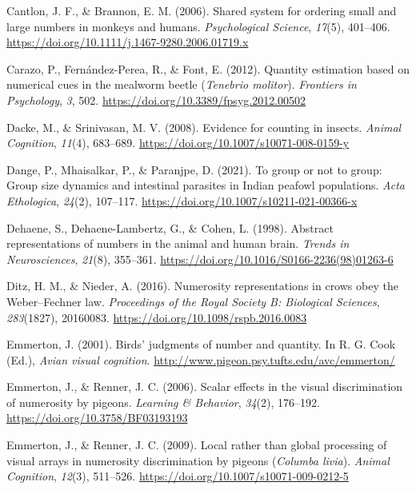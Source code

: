 \documentclass[
  ,pub,floatsintext]{apa6}
\newlength{\cslhangindent}
\newlength{\cslentryspacingunit} %
\newenvironment{CSLReferences}[2] %
 {%
  \setlength{\parindent}{0pt}
  \ifodd #1
  \let\oldpar\par
  \def\par{\hangindent=\cslhangindent\oldpar}
  \fi
  \setlength{\parskip}{#2\cslentryspacingunit}
 }%
 {}
\begin{document}
\begin{CSLReferences}{1}{0}
\leavevmode{}%
Cantlon, J. F., \& Brannon, E. M. (2006). Shared system for ordering small and large numbers in monkeys and humans. \emph{Psychological Science}, \emph{17}(5), 401--406. \url{https://doi.org/10.1111/j.1467-9280.2006.01719.x}

\leavevmode{}%
Carazo, P., Fernández-Perea, R., \& Font, E. (2012). Quantity estimation based on numerical cues in the mealworm beetle (\emph{{Tenebrio} molitor}). \emph{Frontiers in Psychology}, \emph{3}, 502. \url{https://doi.org/10.3389/fpsyg.2012.00502}

\leavevmode{}%
Dacke, M., \& Srinivasan, M. V. (2008). Evidence for counting in insects. \emph{Animal Cognition}, \emph{11}(4), 683--689. \url{https://doi.org/10.1007/s10071-008-0159-y}

\leavevmode{}%
Dange, P., Mhaisalkar, P., \& Paranjpe, D. (2021). To group or not to group: Group size dynamics and intestinal parasites in {Indian} peafowl populations. \emph{Acta Ethologica}, \emph{24}(2), 107--117. \url{https://doi.org/10.1007/s10211-021-00366-x}

\leavevmode{}%
Dehaene, S., Dehaene-Lambertz, G., \& Cohen, L. (1998). Abstract representations of numbers in the animal and human brain. \emph{Trends in Neurosciences}, \emph{21}(8), 355--361. \url{https://doi.org/10.1016/S0166-2236(98)01263-6}

\leavevmode{}%
Ditz, H. M., \& Nieder, A. (2016). Numerosity representations in crows obey the {Weber}--{Fechner} law. \emph{Proceedings of the Royal Society B: Biological Sciences}, \emph{283}(1827), 20160083. \url{https://doi.org/10.1098/rspb.2016.0083}

\leavevmode{}%
Emmerton, J. (2001). Birds' judgments of number and quantity. In R. G. Cook (Ed.), \emph{Avian visual cognition}. \url{http://www.pigeon.psy.tufts.edu/avc/emmerton/}

\leavevmode{}%
Emmerton, J., \& Renner, J. C. (2006). Scalar effects in the visual discrimination of numerosity by pigeons. \emph{Learning \& Behavior}, \emph{34}(2), 176--192. \url{https://doi.org/10.3758/BF03193193}

\leavevmode{}%
Emmerton, J., \& Renner, J. C. (2009). Local rather than global processing of visual arrays in numerosity discrimination by pigeons (\emph{{Columba} livia}). \emph{Animal Cognition}, \emph{12}(3), 511--526. \url{https://doi.org/10.1007/s10071-009-0212-5}


\end{CSLReferences}
\end{document}

